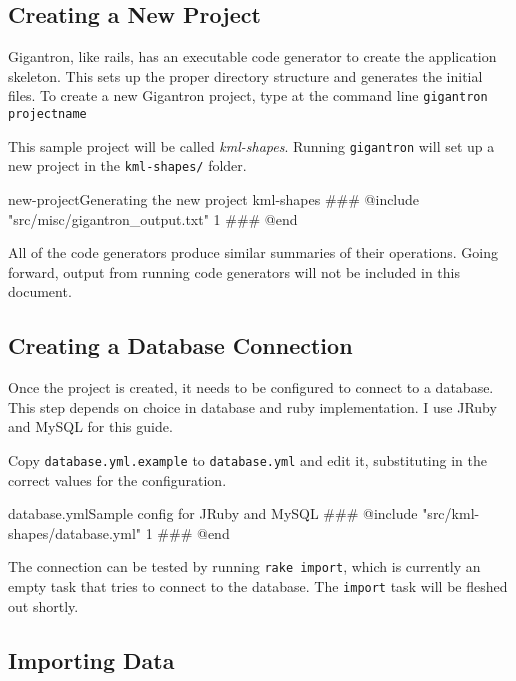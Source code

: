\documentclass[12pt]{article}
\begin{document}
\subsection*{Creating a New Project}

Gigantron, like rails, has an executable code generator to create the application skeleton.  This sets up the proper directory structure and generates the initial files. To create a new Gigantron project, type at the command line \texttt{gigantron projectname}

This sample project will be called \textit{kml-shapes}.  Running \texttt{gigantron} will set up a new project in the \texttt{kml-shapes/} folder.

\begin{code}{new-project}{Generating the new project kml-shapes}
### @include "src/misc/gigantron_output.txt" 1
### @end
\end{code}

All of the code generators produce similar summaries of their operations.  Going forward, output from running code generators will not be included in this document.

\subsection*{Creating a Database Connection}

Once the project is created, it needs to be configured to connect to a database.  This step depends on choice in database and ruby implementation.  I use JRuby and MySQL for this guide.

Copy \texttt{database.yml.example} to \texttt{database.yml} and edit it, substituting in the correct values for the configuration.

\begin{code}{database.yml}{Sample config for JRuby and MySQL}
### @include "src/kml-shapes/database.yml" 1
### @end
\end{code}

The connection can be tested by running \texttt{rake import}, which is currently an empty task that tries to connect to the database.  The \texttt{import} task will be fleshed out shortly.

\subsection*{Importing Data}



\end{document}

